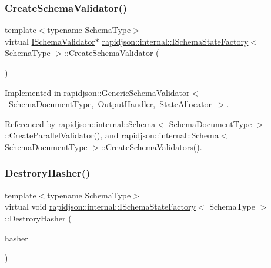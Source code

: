 \subsubsection{\texorpdfstring{CreateSchemaValidator()}{CreateSchemaValidator()}}
{\footnotesize\ttfamily template$<$typename Schema\+Type$>$ \\
virtual \mbox{\hyperlink{classrapidjson_1_1internal_1_1_i_schema_validator}{I\+Schema\+Validator}}$\ast$ \mbox{\hyperlink{classrapidjson_1_1internal_1_1_i_schema_state_factory}{rapidjson\+::internal\+::\+I\+Schema\+State\+Factory}}$<$ Schema\+Type $>$\+::Create\+Schema\+Validator (\begin{DoxyParamCaption}\item[{const Schema\+Type \&}]{ }\end{DoxyParamCaption})\hspace{0.3cm}{\ttfamily [pure virtual]}}



Implemented in \mbox{\hyperlink{classrapidjson_1_1_generic_schema_validator_ae5b23d65482201d75072b958308d9d7b}{rapidjson\+::\+Generic\+Schema\+Validator$<$ Schema\+Document\+Type, Output\+Handler, State\+Allocator $>$}}.



Referenced by rapidjson\+::internal\+::\+Schema$<$ Schema\+Document\+Type $>$\+::\+Create\+Parallel\+Validator(), and rapidjson\+::internal\+::\+Schema$<$ Schema\+Document\+Type $>$\+::\+Create\+Schema\+Validators().

\mbox{\label{classrapidjson_1_1internal_1_1_i_schema_state_factory_abda4f78e5673367fd2bc51c1743d8620}} 
\subsubsection{\texorpdfstring{DestroryHasher()}{DestroryHasher()}}
{\footnotesize\ttfamily template$<$typename Schema\+Type$>$ \\
virtual void \mbox{\hyperlink{classrapidjson_1_1internal_1_1_i_schema_state_factory}{rapidjson\+::internal\+::\+I\+Schema\+State\+Factory}}$<$ Schema\+Type $>$\+::Destrory\+Hasher (\begin{DoxyParamCaption}\item[{void $\ast$}]{hasher }\end{DoxyParamCaption})\hspace{0.3cm}{\ttfamily [pure virtual]}}



